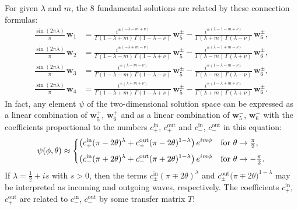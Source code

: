 \documentclass[12pt]{article}
\newcommand{\IN}{\text{in}}
\newcommand{\OUT}{\text{out}}
\newcommand{\ww}{\mathbf{w}}
\begin{document}
For given $\lambda$ and $m$, the $8$ fundamental solutions are related by these connection formulas:
\begin{equation}\label{conrel}
\begin{aligned}
\frac{\sin(2\pi\lambda)}{\pi}\,\ww_{1}
&=\frac{i^{\pm(-\lambda-m+\nu)}}{\Gamma(1-\lambda+m)\,\Gamma(1-\lambda-\nu)}\,
\ww_{5}^{\pm}
-\frac{i^{\pm(\lambda-1-m+\nu)}}{\Gamma(\lambda+m)\,\Gamma(\lambda-\nu)}\,
\ww_{6}^{\pm},\\[3pt]
\frac{\sin(2\pi\lambda)}{\pi}\,\ww_{2}
&=\frac{i^{\pm(-\lambda+m-\nu)}}{\Gamma(1-\lambda-m)\,\Gamma(1-\lambda+\nu)}\,
\ww_{5}^{\pm}
-\frac{i^{\pm(\lambda-1+m-\nu)}}{\Gamma(\lambda-m)\,\Gamma(\lambda+\nu)}\,
\ww_{6}^{\pm},\\[3pt]
\frac{\sin(2\pi\lambda)}{\pi}\,\ww_{3}
&=\frac{i^{\pm(\lambda-m-\nu)}}{\Gamma(1-\lambda-m)\,\Gamma(1-\lambda-\nu)}\,
\ww_{5}^{\pm}
-\frac{i^{\pm(1-\lambda-m-\nu)}}{\Gamma(\lambda-m)\,\Gamma(\lambda-\nu)}\,
\ww_{6}^{\pm},\\[3pt]
\frac{\sin(2\pi\lambda)}{\pi}\,\ww_{4}
&=\frac{i^{\pm(\lambda+m+\nu)}}{\Gamma(1-\lambda+m)\,\Gamma(1-\lambda+\nu)}\,
\ww_{5}^{\pm}
-\frac{i^{\pm(1-\lambda+m+\nu)}}{\Gamma(\lambda+m)\,\Gamma(\lambda+\nu)}\,
\ww_{6}^{\pm}.
\end{aligned}
\end{equation}
In fact, any element $\psi$ of the two-dimensional solution space can be expressed as a linear combination of $\ww_{5}^{+}$, $\ww_{6}^{+}$ and as a linear combination of $\ww_{5}^{-}$, $\ww_{6}^{-}$ with the coefficients proportional to the numbers $c_{+}^{\IN}$, $c_{+}^{\OUT}$ and $c_{-}^{\IN}$, $c_{-}^{\OUT}$ in this equation:
\begin{equation}\label{asform}
\psi(\phi,\theta)\approx \begin{dcases}
\left(c_{+}^{\IN}(\pi-2\theta)^{\lambda}
+c_{+}^{\OUT}(\pi-2\theta)^{1-\lambda}\right)e^{im\phi}
&\text{for }\theta\to\tfrac{\pi}{2},\\[3pt]
\left(c_{-}^{\IN}(\pi+2\theta)^{\lambda}
+c_{-}^{\OUT}(\pi+2\theta)^{1-\lambda}\right)e^{im\phi}
&\text{for }\theta\to-\tfrac{\pi}{2}.
\end{dcases}
\end{equation}
If $\lambda=\frac{1}{2}+is$ with $s>0$, then the terms $c_{\pm}^{\IN}(\pi\mp 2\theta)^{\lambda}$ and $c_{\pm}^{\OUT}(\pi\mp 2\theta\bigr)^{1-\lambda}$ may be interpreted as incoming and outgoing waves, respectively. The coefficients $c_{+}^{\IN}$, $c_{+}^{\OUT}$ are related to $c_{-}^{\IN}$, $c_{-}^{\OUT}$ by some transfer matrix $T$:
\end{document}
